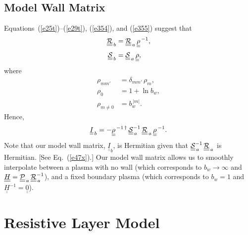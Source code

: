 \documentclass[12pt,prb,aps]{revtex4-1}
\begin{document}
\subsection{Model Wall Matrix}
 Equations~(\ref{e25t})--(\ref{e29t}), (\ref{e354}), and (\ref{e355}) suggest that
 \begin{align}
 \underline{\underline{{\cal R}}}_{\,b}& = \underline{\underline{{\cal R}}}_{\,a} \,\underline{\underline{\rho}}^{\,-1},\\[0.5ex]
 \underline{\underline{{\cal S}}}_{\,b} &= \underline{\underline{{\cal S}}}_{\,a} \,\underline{\underline{\rho}},
 \end{align}
 where
 \begin{align}
 \rho_{mm'} &= \delta_{mm'}\,\rho_m,\\[0.5ex]
 \rho_0 &= 1+\ln b_w,\\[0.5ex]
 \rho_{m\neq 0} &= b_w^{\,|m|}.
 \end{align}
 Hence,
 \begin{equation}
 \underline{\underline{I}}_{\,b}= - \underline{\underline{\rho}}^{\,-1\,\dag}\,\underline{\underline{\cal S}}_{\,a}^{-1}\,\underline{\underline{\cal R}}_{\,a}\,\underline{\underline{\rho}}^{\,-1}.
 \end{equation}
 Note that our model wall matrix, $\underline{\underline{I}}_b$, is Hermitian given that $\underline{\underline{\cal S}}_{\,a}^{-1}\,\underline{\underline{\cal R}}_{\,a}$
 is Hermitian. [See Eq.~(\ref{e47x}).] Our model wall matrix allows us to smoothly interpolate between a plasma with no wall
 (which corresponds to $b_w\rightarrow\infty$ and $\underline{\underline{H}}= \underline{\underline{\cal P}}_{\,a}\,\underline{\underline{\cal R}}_{\,a}^{-1}$),\cite{tj}
 and a fixed boundary plasma (which corresponds to $b_w=1$ and $\underline{\underline{H}}^{-1}= \underline{\underline{0}}$). 
 
\section{Resistive Layer Model}\label{lmodel}
\end{document}
